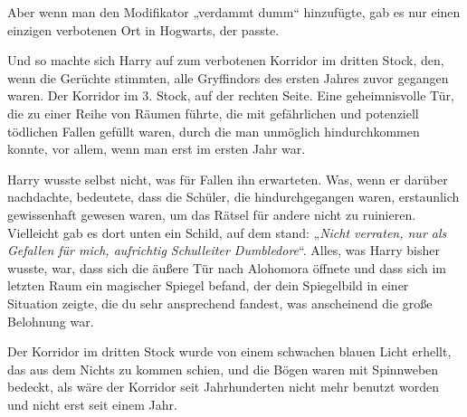 Aber wenn man den Modifikator „verdammt dumm“ hinzufügte, gab es nur einen einzigen verbotenen Ort in Hogwarts, der passte.

Und so machte sich Harry auf zum verbotenen Korridor im dritten Stock, den, wenn die Gerüchte stimmten, alle Gryffindors des ersten Jahres zuvor gegangen waren.
Der Korridor im 3. Stock, auf der rechten Seite. Eine geheimnisvolle Tür, die zu einer Reihe von Räumen führte, die mit gefährlichen und potenziell tödlichen Fallen gefüllt waren, durch die man unmöglich hindurchkommen konnte, vor allem, wenn man erst im ersten Jahr war.

Harry wusste selbst nicht, was für Fallen ihn erwarteten. Was, wenn er darüber nachdachte, bedeutete, dass die Schüler, die hindurchgegangen waren, erstaunlich gewissenhaft gewesen waren, um das Rätsel für andere nicht zu ruinieren. Vielleicht gab es dort unten ein Schild, auf dem stand: „\emph{Nicht verraten, nur als Gefallen für mich, aufrichtig Schulleiter Dumbledore}“. Alles, was Harry bisher wusste, war, dass sich die äußere Tür nach Alohomora öffnete und dass sich im letzten Raum ein magischer Spiegel befand, der dein Spiegelbild in einer Situation zeigte, die du sehr ansprechend fandest, was anscheinend die große Belohnung war.

Der Korridor im dritten Stock wurde von einem schwachen blauen Licht erhellt, das aus dem Nichts zu kommen schien, und die Bögen waren mit Spinnweben bedeckt, als wäre der Korridor seit Jahrhunderten nicht mehr benutzt worden und nicht erst seit einem Jahr.

